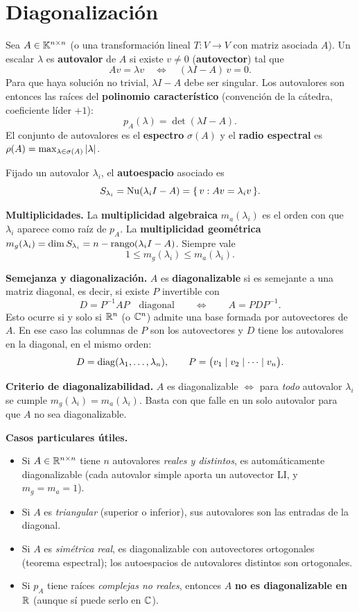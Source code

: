 \section{Diagonalización}

\begin{teoria}
Sea $A \in \mathbb{K}^{n \times n}$ (o una transformación lineal $T:V\to V$ con matriz asociada $A$). Un escalar $\lambda$ es \textbf{autovalor} de $A$ si existe $v \neq 0$ (\textbf{autovector}) tal que
\[
Av = \lambda v \quad\Longleftrightarrow\quad (\lambda I - A)\,v = 0.
\]
Para que haya solución no trivial, $\lambda I - A$ debe ser singular. Los autovalores son entonces las raíces del \textbf{polinomio característico} (convención de la cátedra, coeficiente líder $+1$):
\[
p_A(\lambda) = \det(\lambda I - A).
\]
El conjunto de autovalores es el \textbf{espectro} $\sigma(A)$ y el \textbf{radio espectral} es $\rho(A) = \max_{\lambda \in \sigma(A)} \left\lvert \lambda \right\rvert$.

Fijado un autovalor $\lambda_i$, el \textbf{autoespacio} asociado es
\[
S_{\lambda_i} = \operatorname{Nu}(\lambda_i I - A) = \{\, v : Av = \lambda_i v \,\}.
\]

\textbf{Multiplicidades.} La \textbf{multiplicidad algebraica} $m_a(\lambda_i)$ es el orden con que $\lambda_i$ aparece como raíz de $p_A$. La \textbf{multiplicidad geométrica} $m_g(\lambda_i) = \dim S_{\lambda_i} = n - \operatorname{rango}(\lambda_i I - A)$. Siempre vale
\[
1 \le m_g(\lambda_i) \le m_a(\lambda_i).
\]

\textbf{Semejanza y diagonalización.} $A$ es \textbf{diagonalizable} si es semejante a una matriz diagonal, es decir, si existe $P$ invertible con
\[
D = P^{-1} A P \quad\text{diagonal}\qquad\Longleftrightarrow\qquad A = P D P^{-1}.
\]
Esto ocurre si y solo si $\mathbb{R}^n$ (o $\mathbb{C}^n$) admite una base formada por autovectores de $A$. En ese caso las columnas de $P$ son los autovectores y $D$ tiene los autovalores en la diagonal, en el mismo orden:
\[
D = \operatorname{diag}(\lambda_1, \dots, \lambda_n), \qquad P = \bigl(v_1 \mid v_2 \mid \cdots \mid v_n\bigr).
\]

\textbf{Criterio de diagonalizabilidad.} $A$ es diagonalizable $\iff$ para \emph{todo} autovalor $\lambda_i$ se cumple $m_g(\lambda_i) = m_a(\lambda_i)$. Basta con que falle en un solo autovalor para que $A$ no sea diagonalizable.

\textbf{Casos particulares útiles.}
\begin{itemize}
\item Si $A \in \mathbb{R}^{n \times n}$ tiene $n$ autovalores \emph{reales y distintos}, es automáticamente diagonalizable (cada autovalor simple aporta un autovector LI, y $m_g = m_a = 1$).
\item Si $A$ es \emph{triangular} (superior o inferior), sus autovalores son las entradas de la diagonal.
\item Si $A$ es \emph{simétrica real}, es diagonalizable con autovectores ortogonales (teorema espectral); los autoespacios de autovalores distintos son ortogonales.
\item Si $p_A$ tiene raíces \emph{complejas no reales}, entonces $A$ \textbf{no es diagonalizable en $\mathbb{R}$} (aunque sí puede serlo en $\mathbb{C}$).
\end{itemize}


\end{teoria}
